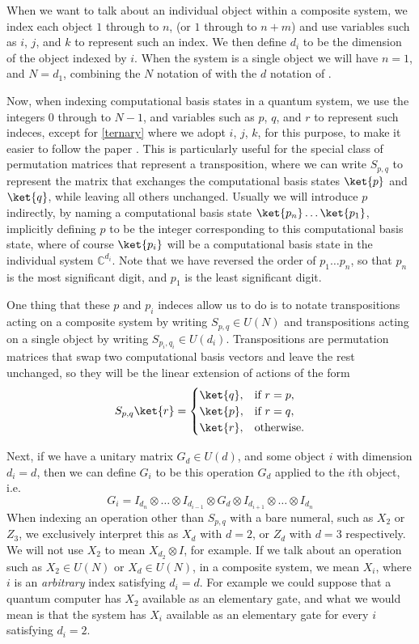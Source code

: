When we want to talk about an individual object within a composite system, we index each object $1$ through to $n$, (or $1$ through to $n+m$) and use variables such as $i$, $j$, and $k$ to represent such an index. We then define $d_i$ to be the dimension of the object indexed by $i$. When the system is a single object we will have $n = 1$, and $N = d_1$, combining the $N$ notation of \cite{tolar-clifford} with the $d$ notation of \cite{multi-valued-logic}.

Now, when indexing computational basis states in a quantum system, we use the integers $0$ through to $N-1$, and variables such as $p$, $q$, and $r$ to represent such indeces, except for \autoref{ternary} where we adopt $i$, $j$, $k$, for this purpose, to make it easier to follow the paper \cite{arithmetics}. This is particularly useful for the special class of permutation matrices that represent a transposition, where we can write $S_{p,q}$ to represent the matrix that exchanges the computational basis states $\ket{p}$ and $\ket{q}$, while leaving all others unchanged. Usually we will introduce $p$ indirectly, by naming a computational basis state $\ket{p_n}\dots\ket{p_1}$, implicitly defining $p$ to be the integer corresponding to this computational basis state, where of course $\ket{p_i}$ will be a computational basis state in the individual system $\mathbb{C}^{d_i}$. Note that we have reversed the order of $p_1 \dots p_n$, so that $p_n$ is the most significant digit, and $p_1$ is the least significant digit.

One thing that these $p$ and $p_i$ indeces allow us to do is to notate transpositions acting on a composite system by writing $S_{p,q} \in U(N)$ and transpositions acting on a single object by writing $S_{p_i,q_i} \in U(d_i)$. Transpositions are permutation matrices that swap two computational basis vectors and leave the rest unchanged, so they will be the linear extension of actions of the form
\[S_{p,q}\ket{r} = \begin{cases}
\ket{q}, & \text{if\ } r = p, \\
\ket{p}, & \text{if\ } r = q, \\
\ket{r}, & \text{otherwise.}
\end{cases}\]

Next, if we have a unitary matrix $G_{d} \in U(d)$, and some object $i$ with dimension $d_i = d$, then we can define $G_i$ to be this operation $G_d$ applied to the $i$th object, i.e. 
\[G_i = I_{d_n}\otimes \dots \otimes I_{d_{i-1}} \otimes G_d \otimes I_{d_{i+1}} \otimes \dots \otimes I_{d_n}\]
When indexing an operation other than $S_{p,q}$ with a bare numeral, such as $X_2$ or $Z_3$, we exclusively interpret this as $X_d$ with $d = 2$, or $Z_d$ with $d = 3$ respectively. We will not use $X_2$ to mean $X_{d_2} \otimes I$, for example. If we talk about an operation such as  $X_2 \in U(N)$ or $X_d \in U(N)$, in a composite system, we mean $X_i$, where $i$ is an \emph{arbitrary} index satisfying $d_i = d$. For example we could suppose that a quantum computer has $X_2$ available as an elementary gate, and what we would mean is that the system has $X_i$ available as an elementary gate for every $i$ satisfying $d_i = 2$.

